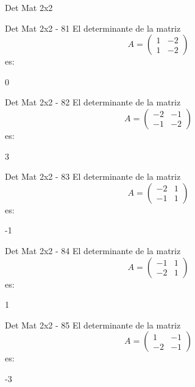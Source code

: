 \documentclass[a4,11pt]{aleph-notas}
\begin{document}
\begin{quiz}{Det Mat 2x2}
\begin{numerical}[tolerance=0]%
    {Det Mat 2x2 - 81}
    El determinante de la matriz
    \[
        A = \begin{pmatrix} 1 & -2 \\ 1 & -2 \end{pmatrix}
    \]
    es:
    \item[] 0
\end{numerical}

\begin{numerical}[tolerance=0]%
    {Det Mat 2x2 - 82}
    El determinante de la matriz
    \[
        A = \begin{pmatrix} -2 & -1 \\ -1 & -2 \end{pmatrix}
    \]
    es:
    \item[] 3
\end{numerical}

\begin{numerical}[tolerance=0]%
    {Det Mat 2x2 - 83}
    El determinante de la matriz
    \[
        A = \begin{pmatrix} -2 & 1 \\ -1 & 1 \end{pmatrix}
    \]
    es:
    \item[] -1
\end{numerical}

\begin{numerical}[tolerance=0]%
    {Det Mat 2x2 - 84}
    El determinante de la matriz
    \[
        A = \begin{pmatrix} -1 & 1 \\ -2 & 1 \end{pmatrix}
    \]
    es:
    \item[] 1
\end{numerical}

\begin{numerical}[tolerance=0]%
    {Det Mat 2x2 - 85}
    El determinante de la matriz
    \[
        A = \begin{pmatrix} 1 & -1 \\ -2 & -1 \end{pmatrix}
    \]
    es:
    \item[] -3
\end{numerical}


\end{quiz}
\end{document}
